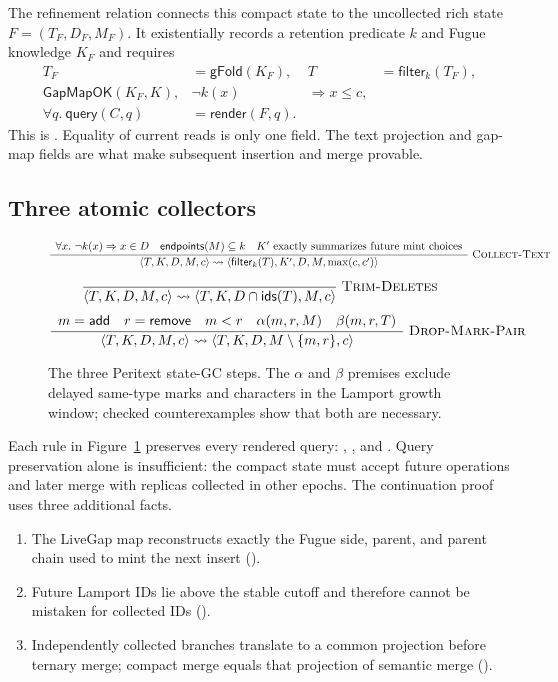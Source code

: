 The refinement relation connects this compact state to the uncollected rich
state $F=(T_F,D_F,M_F)$. It existentially records a retention predicate $k$
and Fugue knowledge $K_F$ and requires
\begin{align*}
 T_F&=\mathsf{gFold}(K_F),
 &T&=\mathsf{filter}_k(T_F),\\
 \mathsf{GapMapOK}(K_F,K),
 &\neg k(x)&\Rightarrow x\le c,\\
 \forall q.\ \mathsf{query}(C,q)&=\mathsf{render}(F,q).&&
\end{align*}
This is . Equality of current reads is only
one field. The text projection and gap-map fields are what make subsequent
insertion and merge provable.

\subsection{Three atomic collectors}

\begin{figure}[H]
\small
\[
\Rule{Collect-Text}{
  \forall x.\ \neg k(x)\Rightarrow x\in D \quad
  \mathsf{endpoints}(M)\subseteq k \quad
  K'\text{ exactly summarizes future mint choices}
}{
  \langle T,K,D,M,c\rangle\rightsquigarrow
  \langle \mathsf{filter}_k(T),K',D,M,\max(c,c')\rangle
}
\]
\[
\Rule{Trim-Deletes}{}{
  \langle T,K,D,M,c\rangle\rightsquigarrow
  \langle T,K,D\cap\ids(T),M,c\rangle
}
\]
\[
\Rule{Drop-Mark-Pair}{
  m=\mathsf{add}\quad r=\mathsf{remove}\quad m<r\quad
  \alpha(m,r,M)\quad\beta(m,r,T)
}{
  \langle T,K,D,M,c\rangle\rightsquigarrow
  \langle T,K,D,M\setminus\{m,r\},c\rangle
}
\]
\caption{The three Peritext state-GC steps. The $\alpha$ and $\beta$ premises
exclude delayed same-type marks and characters in the Lamport growth window;
checked counterexamples show that both are necessary.}
\label{fig:state-gc-rules}
\end{figure}

Each rule in Figure~\ref{fig:state-gc-rules} preserves every rendered query:
,
, and
. Query preservation alone is
insufficient: the compact state must accept future operations and later merge
with replicas collected in other epochs. The continuation proof uses three
additional facts.

\begin{enumerate}
\item The LiveGap map reconstructs exactly the Fugue side, parent, and parent
chain used to mint the next insert
().
\item Future Lamport IDs lie above the stable cutoff and therefore cannot be
mistaken for collected IDs ().
\item Independently collected branches translate to a common projection
before ternary merge; compact merge equals that projection of semantic merge
().
\end{enumerate}

